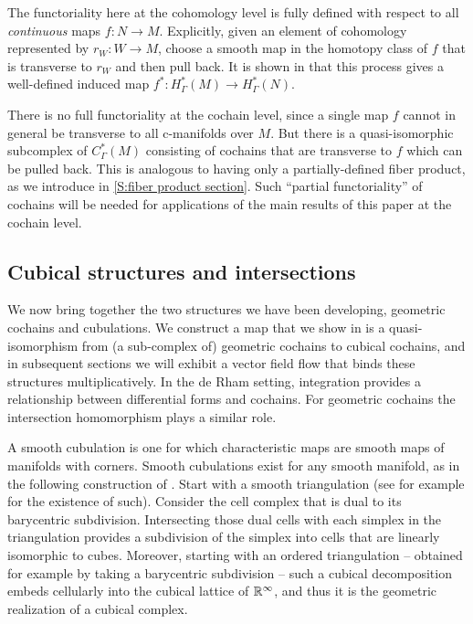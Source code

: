 The functoriality here at the cohomology level is fully defined with respect to all \textit{continuous} maps $f \colon N \to M$.
Explicitly, given an element of cohomology represented by $r_W \colon W \to M$, choose a smooth map in the homotopy class of $f$ that is transverse to $r_W$ and then pull back.
It is shown in \cite[Proposition 5.16]{medina2022foundations} that this process gives a well-defined induced map $f^* \colon H^*_\Gamma(M) \to H^*_\Gamma(N)$.

There is no full functoriality at the cochain level, since a single map $f$ cannot in general be transverse to all c-manifolds over $M$.
But there is a quasi-isomorphic subcomplex of $C_\Gamma^*(M)$ consisting of cochains that are transverse to $f$ which can be pulled back.
This is analogous to having only a partially-defined fiber product, as we introduce in \cref{S:fiber product section}.
Such ``partial functoriality'' of cochains will be needed for applications of the main results of this paper at the cochain level.

\subsection{Cubical structures and intersections}

We now bring together the two structures we have been developing, geometric cochains and cubulations.
We construct a map that we show in \cite{medina2022foundations} is a quasi-isomorphism from (a sub-complex of) geometric cochains to cubical cochains, and in subsequent sections we will exhibit a vector field flow that binds these structures multiplicatively.
In the de Rham setting, integration provides a relationship between differential forms and cochains.
For geometric cochains the intersection homomorphism plays a similar role.

A smooth cubulation is one for which characteristic maps are smooth maps of manifolds with corners.
Smooth cubulations exist for any smooth manifold, as in the following construction of \cite{ShSh92}.
Start with a smooth triangulation (see for example \cite[Theorem 10.6]{Munk66} for the existence of such).
Consider the cell complex that is dual to its barycentric subdivision. Intersecting those dual cells with each simplex in the triangulation provides a subdivision of the simplex into cells that are linearly isomorphic to cubes.
Moreover, starting with an ordered triangulation -- obtained for example by taking a barycentric subdivision -- such a cubical decomposition embeds cellularly into the cubical lattice of $\mathbb{R}^\infty$, and thus it is the geometric realization of a cubical complex.

